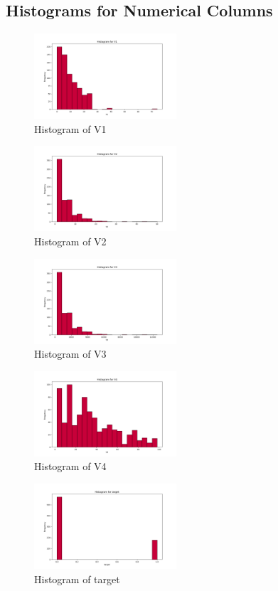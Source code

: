 \documentclass{article}%
\begin{document}
%
\subsection{Histograms for Numerical Columns}%
\label{subsec:HistogramsforNumericalColumns}%


\begin{figure}[h!]%
\centering%
\includegraphics[width=200px]{eda/histograms/V1_histogram.png}%
\caption{Histogram of V1}%
\end{figure}

%


\begin{figure}[h!]%
\centering%
\includegraphics[width=200px]{eda/histograms/V2_histogram.png}%
\caption{Histogram of V2}%
\end{figure}

%


\begin{figure}[h!]%
\centering%
\includegraphics[width=200px]{eda/histograms/V3_histogram.png}%
\caption{Histogram of V3}%
\end{figure}

%


\begin{figure}[h!]%
\centering%
\includegraphics[width=200px]{eda/histograms/V4_histogram.png}%
\caption{Histogram of V4}%
\end{figure}

%


\begin{figure}[h!]%
\centering%
\includegraphics[width=200px]{eda/histograms/target_histogram.png}%
\caption{Histogram of target}%
\end{figure}

%
\end{document}
